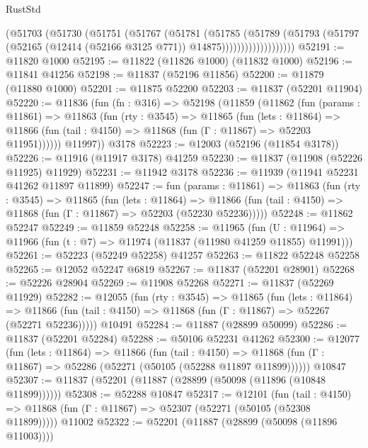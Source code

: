\begin{lexlean}{RustStd}
\begin{coremodule}
                      (@51703
                        (@51730
                          (@51751
                            (@51767
                              (@51781
                                (@51785
                                  (@51789
                                    (@51793
                                      (@51797
                                        (@52165
                                          (@12414 (@52166 @3125 @771))
                                          @14875)))))))))))))))))))
@52191 := @11820 @1000
@52195 := @11822 (@11826 @1000) (@11832 @1000)
@52196 := @11841 @41256
@52198 := @11837 (@52196 @11856)
@52200 := @11879 (@11880 @1000)
@52201 := @11875 @52200
@52203 := @11837 (@52201 @11904)
@52220 := @11836
    (fun (fn : @316) =>
    @52198
      (@11859
        (@11862
          (fun (params : @11861) =>
          @11863
            (fun (rty : @3545) =>
            @11865
              (fun (lets : @11864) =>
              @11866 (fun (tail : @4150) => @11868 (fun (Γ : @11867) => @52203 @11951))))))
        @11997))
    @3178
@52223 := @12003 (@52196 (@11854 @3178))
@52226 := @11916 (@11917 @3178) @41259
@52230 := @11837 (@11908 (@52226 @11925) @11929)
@52231 := @11942 @3178
@52236 := @11939 (@11941 @52231 @41262 @11897 @11899)
@52247 := fun (params : @11861) =>
  @11863
    (fun (rty : @3545) =>
    @11865
      (fun (lets : @11864) =>
      @11866 (fun (tail : @4150) => @11868 (fun (Γ : @11867) => @52203 (@52230 @52236)))))
@52248 := @11862 @52247
@52249 := @11859 @52248
@52258 := @11965
    (fun (U : @11964) => @11966 (fun (t : @7) => @11974 (@11837 (@11980 @41259 @11855) @11991)))
@52261 := @52223 (@52249 @52258) @41257
@52263 := @11822 @52248 @52258
@52265 := @12052 @52247 @6819
@52267 := @11837 (@52201 @28901)
@52268 := @52226 @28904
@52269 := @11908 @52268
@52271 := @11837 (@52269 @11929)
@52282 := @12055
    (fun (rty : @3545) =>
    @11865
      (fun (lets : @11864) =>
      @11866 (fun (tail : @4150) => @11868 (fun (Γ : @11867) => @52267 (@52271 @52236)))))
    @10491
@52284 := @11887 (@28899 @50099)
@52286 := @11837 (@52201 @52284)
@52288 := @50106 @52231 @41262
@52300 := @12077
    (fun (lets : @11864) =>
    @11866
      (fun (tail : @4150) =>
      @11868 (fun (Γ : @11867) => @52286 (@52271 (@50105 (@52288 @11897 @11899))))))
    @10847
@52307 := @11837 (@52201 (@11887 (@28899 (@50098 (@11896 (@10848 @11899))))))
@52308 := @52288 @10847
@52317 := @12101
    (fun (tail : @4150) => @11868 (fun (Γ : @11867) => @52307 (@52271 (@50105 (@52308 @11899)))))
    @11002
@52322 := @52201 (@11887 (@28899 (@50098 (@11896 @11003))))

\end{coremodule}
\end{lexlean}
